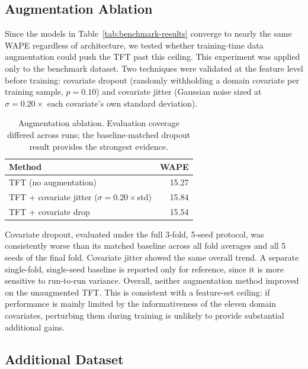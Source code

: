 \documentclass[11pt]{article}
\begin{document}
\subsection{Augmentation Ablation}
\label{sec:augmentation}

Since the models in Table~\ref{tab:benchmark-results} converge to nearly the same WAPE regardless
of architecture, we tested whether training-time data augmentation could push the TFT past this
ceiling. This experiment was applied only to the benchmark dataset. Two techniques were validated at the feature level
before training: covariate dropout (randomly withholding a domain covariate per training sample,
$p{=}0.10$) and covariate jitter (Gaussian noise sized at $\sigma{=}0.20\times$ each covariate's
own standard deviation). 

\begin{table}[h]
\centering
\begin{tabular}{lr}
\toprule
Method & WAPE  \\
\midrule
TFT (no augmentation) & 15.27 \\
TFT + covariate jitter ($\sigma{=}0.20\times$std) & 15.84 \\
TFT + covariate drop & 	15.54 \\
\bottomrule
\end{tabular}
\caption{Augmentation ablation. Evaluation coverage differed across runs; the baseline-matched dropout result provides the strongest evidence.}
\label{tab:augmentation}
\end{table}

\noindent Covariate dropout, evaluated under the full 3-fold, 5-seed protocol, was consistently
worse than its matched baseline across all fold averages and all 5 seeds of the final fold.
Covariate jitter showed the same overall trend. A separate single-fold, single-seed baseline is
reported only for reference, since it is more sensitive to run-to-run variance. Overall, neither
augmentation method improved on the unaugmented TFT. This is consistent with a feature-set ceiling:
if performance is mainly limited by the informativeness of the eleven domain covariates, perturbing
them during training is unlikely to provide substantial additional gains.

\subsection{Additional Dataset}
\label{sec:cow}
\end{document}
